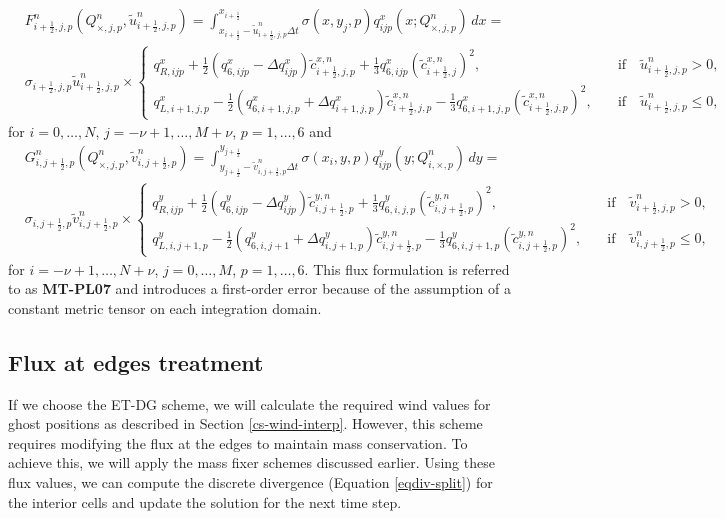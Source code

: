\begin{align}
	\label{chp5-flux-xdir--pl07}
	&F_{i+\frac{1}{2},j,p}^n ({Q^n_{\times,j,p},\tilde{u}^n_{i+\frac{1}{2},j,p}}) = 
	\int_{x_{i+\frac{1}{2}}-\tilde{u}_{i+\frac{1}{2},j,p}^n\Delta t}^{x_{i+\frac{1}{2}}}
	{\sigma(x,y_j,p) q_{ijp}^x(x;Q_{\times, j,p}^n) \,dx} = \\
	&{\sigma}_{i+\frac{1}{2},j,p}\tilde{u}^{n}_{i+\frac{1}{2},j,p} \times
	\begin{cases}
		q_{R,ijp}^x +\frac{1}{2}(q_{6,ijp}^x - \Delta q_{ijp}^x){\tilde{c}_{i+\frac{1}{2},j,p}^{x,n}}
		+\frac{1}{3}{q_{6,ijp}^x}(\tilde{c}_{i+\frac{1}{2},j}^{x,n})^2,
		\quad &\text{if} \quad \tilde{u}_{i+\frac{1}{2},j,p}^n>0,\\ \nonumber
		q_{L,i+1,j,p}^x - \frac{1}{2}(q_{6,i+1,j,p}^x + \Delta q_{i+1,j,p}^x){\tilde{c}_{i+\frac{1}{2},j,p}^{x,n}}
		-\frac{1}{3}{q_{6,i+1,j,p}^x}(\tilde{c}_{i+\frac{1}{2},j,p}^{x,n})^2,
		\quad &\text{if} \quad \tilde{u}_{i+\frac{1}{2},j,p}^n\leq0,\nonumber
	\end{cases}
\end{align}
for $i=0, \ldots, N$, $j=-\nu+1, \ldots, M+\nu$, $p=1,\ldots,6$ and 
\begin{align}
	\label{chp5-flux-ydir-pl07}
	&G_{i,j+\frac{1}{2},p}^n ({Q^n_{\times,j,p},\tilde{v}^n_{i,j+\frac{1}{2},p}}) =
	\int_{y_{j+\frac{1}{2}}-\tilde{v}_{i,j+\frac{1}{2},p}^n\Delta t}^{y_{j+\frac{1}{2}}}
	{\sigma(x_i,y,p)q_{ijp}^y(y;Q_{i,\times, p}^n) \,dy} = \\
	&{\sigma}_{i,j+\frac{1}{2},p} \tilde{v}^n_{i,j+\frac{1}{2},p}\times
	\begin{cases}
		q_{R,ijp}^y +\frac{1}{2}(q_{6,ijp}^y - \Delta q_{ijp}^y){\tilde{c}_{i,j+\frac{1}{2},p}^{y,n}}
		+\frac{1}{3}{q_{6,i,j,p}^y}(\tilde{c}_{i,j+\frac{1}{2},p}^{y,n})^2,
		\quad &\text{if} \quad \tilde{v}_{i+\frac{1}{2},j,p}^n>0,\\ \nonumber
		q_{L,i,j+1,p}^y - \frac{1}{2}(q_{6,i,j+1}^y + \Delta q_{i,j+1,p}^y){\tilde{c}_{i,j+\frac{1}{2},p}^{y,n}}
		-\frac{1}{3}{q_{6,i,j+1,p}^y}(\tilde{c}_{i,j+\frac{1}{2},p}^{y,n})^2,
		\quad &\text{if} \quad \tilde{v}_{i,j+\frac{1}{2},p}^n\leq0,\nonumber
	\end{cases}
\end{align}
for $i=-\nu+1, \ldots, N+\nu$, $j=0, \ldots, M$, $p=1,\ldots,6$.
This flux formulation is referred to as \textbf{MT-PL07} and introduces a first-order
error because of the assumption of a constant metric tensor on each integration domain.

\subsection{Flux at edges treatment}
If we choose the ET-DG scheme, we will calculate the required wind values for ghost positions as
described in Section \ref{cs-wind-interp}.
However, this scheme requires modifying the flux at the edges to maintain mass conservation.
To achieve this, we will apply the mass fixer schemes discussed earlier.
Using these flux values, we can compute the discrete divergence (Equation \eqref{eqdiv-split}) for the interior cells and update the solution for the next time step.


